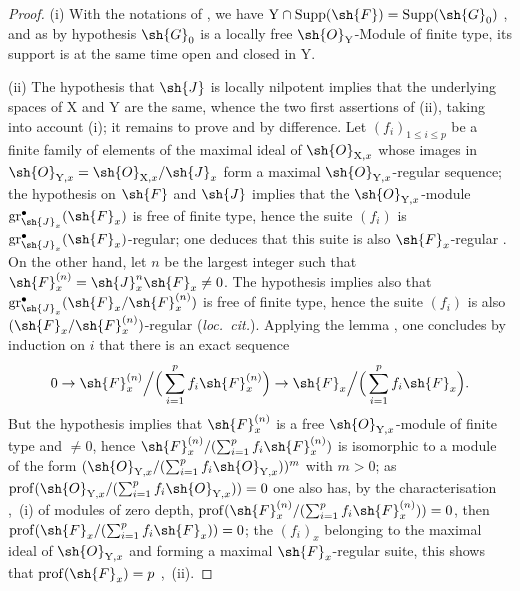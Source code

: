 \begin{proof}
(i) With the notations of , we have $\mathrm{Y}\cap\operatorname{Supp}(\sh{F})=\operatorname{Supp}(\sh{G}_0)$ , and as by hypothesis $\sh{G}_0$ is a locally free $\sh{O}_\mathrm{Y}$-Module of finite type, its support is at the same time open and closed in $\mathrm{Y}$.


(ii) The hypothesis that $\sh{J}$ is locally nilpotent implies that the underlying spaces of $\mathrm{X}$ and $\mathrm{Y}$ are the same, whence the two first assertions of (ii), taking into account (i); it remains to prove  and  by difference. Let $(f_i)_{1\leqslant i\leqslant p}$ be a finite family of elements of the maximal ideal of $\sh{O}_{\mathrm{X},x}$ whose images in $\sh{O}_{\mathrm{Y},x}=\sh{O}_{\mathrm{X},x}/\sh{J}_x$ form a maximal $\sh{O}_{\mathrm{Y},x}$-regular sequence; the hypothesis on $\sh{F}$ and $\sh{J}$ implies that the $\sh{O}_{\mathrm{Y},x}$-module $\operatorname{gr}^{\bullet}_{\sh{J}_x}(\sh{F}_x)$ is free of finite type, hence the suite $(f_i)$ is $\operatorname{gr}^{\bullet}_{\sh{J}_x}(\sh{F}_x)$-regular; one deduces that this suite is also $\sh{F}_x$-regular . On the other hand, let $n$ be the largest integer such that $\sh{F}^{(n)}_x=\sh{J}^n_x\sh{F}_x\neq 0$. The hypothesis implies also that $\operatorname{gr}^{\bullet}_{\sh{J}_x}(\sh{F}_x/\sh{F}^{(n)}_x)$ is free of finite type, hence the suite $(f_i)$ is also $(\sh{F}_x/\sh{F}^{(n)}_x)$-regular (\emph{loc.\ cit.}). Applying the lemma , one concludes by induction on $i$ that there is an exact sequence
\[
0\to\sh{F}^{(n)}_x\Big/\Big(\sum_{i=1}^p f_i\sh{F}^{(n)}_x\Big) \to \sh{F}_x\Big/\Big(\sum_{i=1}^p f_i\sh{F}_x\Big).
\]
But the hypothesis implies that $\sh{F}^{(n)}_x$ is a free $\sh{O}_{\mathrm{Y},x}$-module of finite type and $\neq 0$, hence $\sh{F}^{(n)}_x/(\sum_{i=1}^p f_i\sh{F}^{(n)}_x)$ is isomorphic to a module of the form $(\sh{O}_{\mathrm{Y},x}/(\sum_{i=1}^p f_i\sh{O}_{\mathrm{Y},x}))^m$ with $m>0$; as $\operatorname{prof}(\sh{O}_{\mathrm{Y},x}/(\sum_{i=1}^p f_i\sh{O}_{\mathrm{Y},x}))=0$  one also has, by the characterisation ,~(i) of modules of zero depth, $\operatorname{prof}(\sh{F}^{(n)}_x/(\sum_{i=1}^p f_i\sh{F}^{(n)}_x))=0$, then $\operatorname{prof}(\sh{F}_x/(\sum_{i=1}^p f_i\sh{F}_x))=0$; the $(f_i)_x$ belonging to the maximal ideal of $\sh{O}_{\mathrm{Y},x}$ and forming a maximal $\sh{F}_x$-regular suite, this shows that $\operatorname{prof}(\sh{F}_x)=p$ ,~(ii).
\end{proof}

